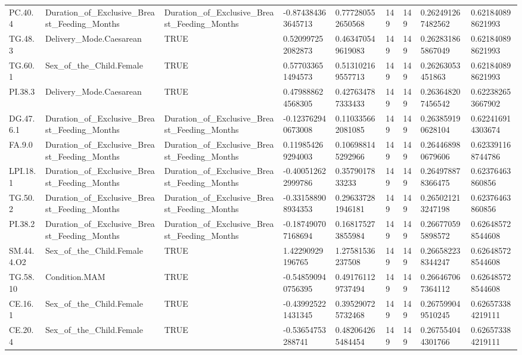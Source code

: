 \begin{longtable}{lllllllll}
PC.40.4 & Duration\_of\_Exclusive\_Breast\_Feeding\_Months & Duration\_of\_Exclusive\_Breast\_Feeding\_Months & -0.874384363645713 & 0.777280552650568 & 149 & 149 & 0.262491267482562 & 0.621840898621993 \\
TG.48.3 & Delivery\_Mode.Caesarean & TRUE & 0.520997252082873 & 0.463470549619083 & 149 & 149 & 0.262831865867049 & 0.621840898621993 \\
TG.60.1 & Sex\_of\_the\_Child.Female & TRUE & 0.577033651494573 & 0.513102169557713 & 149 & 149 & 0.26263053451863 & 0.621840898621993 \\
PI.38.3 & Delivery\_Mode.Caesarean & TRUE & 0.479888624568305 & 0.427634787333433 & 149 & 149 & 0.263648207456542 & 0.622382653667902 \\
DG.47.6.1 & Duration\_of\_Exclusive\_Breast\_Feeding\_Months & Duration\_of\_Exclusive\_Breast\_Feeding\_Months & -0.123762940673008 & 0.110335662081085 & 149 & 149 & 0.263859190628104 & 0.622416914303674 \\
FA.9.0 & Duration\_of\_Exclusive\_Breast\_Feeding\_Months & Duration\_of\_Exclusive\_Breast\_Feeding\_Months & 0.119854269294003 & 0.106988145292966 & 149 & 149 & 0.264468980679606 & 0.623391168744786 \\
LPI.18.1 & Duration\_of\_Exclusive\_Breast\_Feeding\_Months & Duration\_of\_Exclusive\_Breast\_Feeding\_Months & -0.400512622999786 & 0.3579017833233 & 149 & 149 & 0.264978878366475 & 0.62376463860856 \\
TG.50.2 & Duration\_of\_Exclusive\_Breast\_Feeding\_Months & Duration\_of\_Exclusive\_Breast\_Feeding\_Months & -0.331588908934353 & 0.296337281946181 & 149 & 149 & 0.265021213247198 & 0.62376463860856 \\
PI.38.2 & Duration\_of\_Exclusive\_Breast\_Feeding\_Months & Duration\_of\_Exclusive\_Breast\_Feeding\_Months & -0.187490707168694 & 0.168175273855984 & 149 & 149 & 0.266770595898572 & 0.626485728544608 \\
SM.44.4.O2 & Sex\_of\_the\_Child.Female & TRUE & 1.42290929196765 & 1.27581536237508 & 149 & 149 & 0.266582238344247 & 0.626485728544608 \\
TG.58.10 & Condition.MAM & TRUE & -0.548590940756395 & 0.491761129737494 & 149 & 149 & 0.266467067364112 & 0.626485728544608 \\
CE.16.1 & Sex\_of\_the\_Child.Female & TRUE & -0.439925221431345 & 0.395290725732468 & 149 & 149 & 0.267599049510245 & 0.626573384219111 \\
CE.20.4 & Sex\_of\_the\_Child.Female & TRUE & -0.53654753288741 & 0.482064265484454 & 149 & 149 & 0.267554044301766 & 0.626573384219111 \\

\end{longtable}
